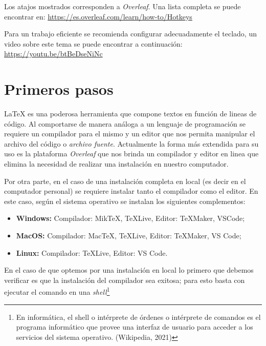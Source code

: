 \documentclass[a4,11pt]{aleph-notas}
\begin{document}
\begin{advertencia}
Los atajos mostrados corresponden a \emph{Overleaf}. Una  lista completa se puede encontrar en: \href{https://es.overleaf.com/learn/how-to/Hotkeys}{https://es.overleaf.com/learn/how-to/Hotkeys}
\end{advertencia}

Para un trabajo eficiente se recomienda configurar adecuadamente el teclado, un video sobre este tema se puede encontrar a continuación: \href{https://youtu.be/btBeDseNiNc}{https://youtu.be/btBeDseNiNc}

\section{Primeros pasos}

\LaTeX \hspace{3pt} es una poderosa herramienta que compone textos en función de lineas de código. Al comportarse de manera análoga a un lenguaje de programación se requiere un compilador para el mismo y un editor que nos permita manipular el archivo del código o \emph{archivo fuente}. Actualmente la forma más extendida para su uso es la plataforma \emph{Overleaf} que nos brinda un compilador y editor en linea que elimina la necesidad de realizar una instalación en nuestro computador.


Por otra parte, en el caso de una instalación completa en local (es decir en el computador personal) se requiere instalar tanto el compilador como el editor. En este caso, según el sistema operativo se instalan los siguientes complementos:

\begin{itemize}
    \item \textbf{Windows:} Compilador: Mik\TeX{}, \TeX Live, Editor: \TeX Maker, VSCode;
    \item \textbf{MacOS:} Compilador: Mac\TeX{}, \TeX Live, Editor: \TeX Maker, VS Code;
    \item \textbf{Linux:} Compilador: \TeX Live, Editor: VS Code.
\end{itemize}

En el caso de que optemos por una instalación en local lo primero que debemos verificar es que la instalación del compilador sea exitosa; para esto basta con ejecutar el comando \verb@latex@ en una \emph{shell}\footnote{En informática, el shell o intérprete de órdenes o intérprete de comandos es el programa informático que provee una interfaz de usuario para acceder a los servicios del sistema operativo. (Wikipedia, 2021)}
\end{document}

